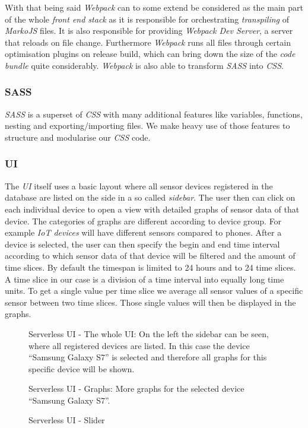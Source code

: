 With that being said \textit{Webpack} can to some extend be considered as the main part of the whole
\textit{front end stack} as it is responsible for orchestrating \textit{transpiling} of
\textit{MarkoJS} files. It is also responsible for providing \textit{Webpack Dev Server}, a server
that reloads on file change. Furthermore \textit{Webpack} runs all files through certain
optimisation plugins on release build, which can bring down the size of the \textit{code bundle}
quite considerably. \textit{Webpack} is also able to transform \textit{SASS} into \textit{CSS}.

\subsubsection{SASS}

\textit{SASS} is a superset of \textit{CSS} with many additional features like variables, functions,
nesting and exporting/importing files. We make heavy use of those features to structure and
modularise our \textit{CSS} code.

\subsubsection{UI}

The \textit{UI} itself uses a basic layout where all sensor devices registered in the database are
listed on the side in a so called \textit{sidebar}. The user then can click on each individual
device to open a view with detailed graphs of sensor data of that device. The categories of graphs
are different according to device group. For example \textit{IoT devices} will have different
sensors compared to phones. After a device is selected, the user can then specify the begin and end
time interval according to which sensor data of that device will be filtered and the amount of time
slices. By default the timespan is limited to 24 hours and to 24 time slices. A time slice in our
case is a division of a time interval into equally long time units. To get a single value per time
slice we average all sensor values of a specific sensor between two time slices. Those single values
will then be displayed in the graphs.

\begin{figure}[H]
  \centering
  \caption{Serverless UI - The whole UI: On the left the sidebar can be seen, where all registered devices are listed. In this case the device “Samsung Galaxy S7” is selected and therefore all graphs for this specific device will be shown. }
\end{figure}

\begin{figure}[H]
  \centering
  \caption{Serverless UI - Graphs: More graphs for the selected device “Samsung Galaxy S7”.}
\end{figure}

\begin{figure}[H]
  \centering
  \caption{Serverless UI - Slider}
\end{figure}
